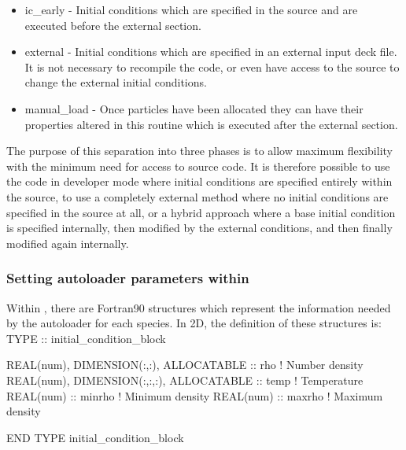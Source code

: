 \documentclass[12pt,a4paper]{article}
\newcommand{\EPOCH}{{\color{warwickdark}\fontfamily{phv}\selectfont{EPOCH}}}
\newenvironment{boxverbatim}{\lboxverbatim{none}}{\endlboxverbatim}
\begin{document}
\begin{itemize}
\item ic\_early - Initial conditions which are specified in the {\EPOCH}
  source and are executed before the external section.
\item external - Initial conditions which are specified in an external input
  deck file. It is not necessary to recompile the code, or even have
  access to the source to change the external initial conditions.
\item manual\_load - Once particles have been allocated they can have their
  properties altered in this routine which is executed after the external
  section.
\end{itemize}

The purpose of this separation into three phases is to allow maximum
flexibility with the minimum need for access to source code. It is therefore
possible to use the code in developer mode where initial conditions are
specified entirely within the {\EPOCH} source, to use a completely external
method where no initial conditions are specified in the {\EPOCH} source at all,
or a hybrid approach where a base initial condition is specified internally,
then modified by the external conditions, and then finally modified again
internally.

\subsubsection{Setting autoloader parameters within {\EPOCH}}
Within {\EPOCH}, there are Fortran90 structures which represent the information
needed by the autoloader for each species. In 2D, the definition of these
structures is:
\begin{boxverbatim}
TYPE :: initial_condition_block

  REAL(num), DIMENSION(:,:), ALLOCATABLE :: rho ! Number density
  REAL(num), DIMENSION(:,:,:), ALLOCATABLE :: temp ! Temperature
  REAL(num) :: minrho ! Minimum density
  REAL(num) :: maxrho ! Maximum density

END TYPE initial_condition_block
\end{boxverbatim}
\end{document}
